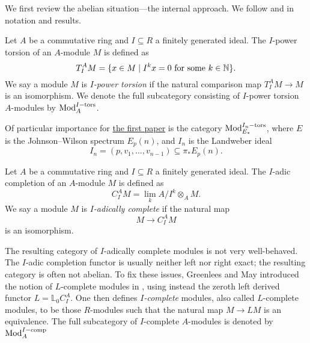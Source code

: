 We first review the abelian situation---the internal approach. We follow \cite{barthel-heard-valenzuela_2018} and \cite{barthel-heard-valenzuela_2020} in notation and results. 

\begin{definition}
    \label{def:I-power-torsion-module}
    Let $A$ be a commutative ring and $I\subseteq R$ a finitely generated ideal. The $I$-power torsion of an $A$-module $M$ is defined as
    \[T_I^A M = \{x\in M \mid I^k x = 0 \text{ for some } k\in \mathbb{N}\}.\]
    We say a module $M$ is \emph{$I$-power torsion} if the natural comparison map $T_I^A M\longrightarrow M$ is an isomorphism. We denote the full subcategory consisting of $I$-power torsion $A$-modules by $\mathrm{Mod}_A^{I-\mathrm{tors}}$. 
\end{definition}

\begin{example}
    Of particular importance for \hyperref[ch1]{the first paper} is the category $\mathrm{Mod}_{E_*}^{I_n-\mathrm{tors}}$, where $E$ is the Johnson--Wilson spectrum $E_p(n)$, and $I_n$ is the Landweber ideal 
    \[I_n = (p, v_1, \ldots, v_{n-1})\subseteq \pi_* E_p(n).\]
\end{example}

\begin{definition}
    Let $A$ be a commutative ring and $I\subseteq R$ a finitely generated ideal. The $I$-adic completion of an $A$-module $M$ is defined as
    \[C_I^A M = \lim_k A/I^k\otimes_A M.\]
    We say a module $M$ is \emph{$I$-adically complete} if the natural map 
    \[M\longrightarrow C_I^A M\]
    is an isomorphism. 
\end{definition}

\begin{remark}
    \label{ch0:rm:I-complete-vs-I-adically-complete}
    The resulting category of $I$-adically complete modules is not very well-behaved. The $I$-adic completion functor is usually neither left nor right exact; the resulting category is often not abelian. To fix these issues, Greenlees and May introduced the notion of $L$-complete modules in \cite{greenlees-may_92}, using instead the zeroth left derived functor $L=\mathbb{L}_0 C_I^A$. One then defines \emph{$I$-complete} modules, also called $L$-complete modules, to be those $R$-modules such that the natural map $M\longrightarrow L M$ is an equivalence. The full subcategory of $I$-complete $A$-modules is denoted by $\mathrm{Mod}_A^{I-\mathrm{comp}}$
\end{remark}

